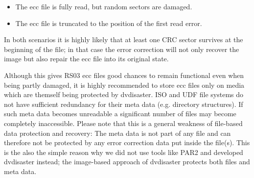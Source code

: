 \begin{itemize}
\item The ecc file is fully read, but random sectors are damaged.
\item The ecc file is truncated to the position of the first read error.
\end{itemize}

In both scenarios it is highly likely that at least one CRC sector survives
at the beginning of the file; in that case the error correction will not
only recover the image but also repair the ecc file into its original state.

\bigskip

Although this gives RS03 ecc files good chances to remain functional even
when being partly damaged, it is highly recommended to store ecc files 
only on media which are themself being protected by dvdisaster. 
ISO and UDF file systems
do not have sufficient redundancy for their meta data (e.g. directory
structures). If such meta data becomes unreadable a significant
number of files may become completely inaccessible. 
Please note that this is a
general weakness of file-based data protection and recovery: The
meta data is not part of any file and can therefore not be protected by
any error correction data put inside the file(s). 
\smallskip
This is the also the simple reason why we did not use tools like PAR2 
and developed dvdisaster instead; 
the image-based approach of dvdisaster protects
both files and meta data.
